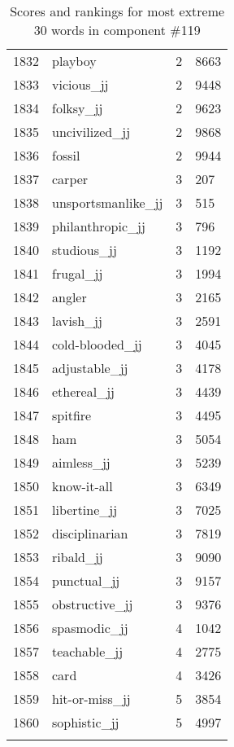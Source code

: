 \begin{longtable}[!htbp]{| rlr@{.}l |}
    1832 & playboy & 2 & 8663 \\
    1833 & vicious\_jj & 2 & 9448 \\
    1834 & folksy\_jj & 2 & 9623 \\
    1835 & uncivilized\_jj & 2 & 9868 \\
    1836 & fossil & 2 & 9944 \\
    1837 & carper & 3 & 207 \\
    1838 & unsportsmanlike\_jj & 3 & 515 \\
    1839 & philanthropic\_jj & 3 & 796 \\
    1840 & studious\_jj & 3 & 1192 \\
    1841 & frugal\_jj & 3 & 1994 \\
    1842 & angler & 3 & 2165 \\
    1843 & lavish\_jj & 3 & 2591 \\
    1844 & cold-blooded\_jj & 3 & 4045 \\
    1845 & adjustable\_jj & 3 & 4178 \\
    1846 & ethereal\_jj & 3 & 4439 \\
    1847 & spitfire & 3 & 4495 \\
    1848 & ham & 3 & 5054 \\
    1849 & aimless\_jj & 3 & 5239 \\
    1850 & know-it-all & 3 & 6349 \\
    1851 & libertine\_jj & 3 & 7025 \\
    1852 & disciplinarian & 3 & 7819 \\
    1853 & ribald\_jj & 3 & 9090 \\
    1854 & punctual\_jj & 3 & 9157 \\
    1855 & obstructive\_jj & 3 & 9376 \\
    1856 & spasmodic\_jj & 4 & 1042 \\
    1857 & teachable\_jj & 4 & 2775 \\
    1858 & card & 4 & 3426 \\
    1859 & hit-or-miss\_jj & 5 & 3854 \\
    1860 & sophistic\_jj & 5 & 4997 \\
    \hline
    \caption{Scores and rankings for most extreme 30 words in component \#119} \\
\end{longtable}
